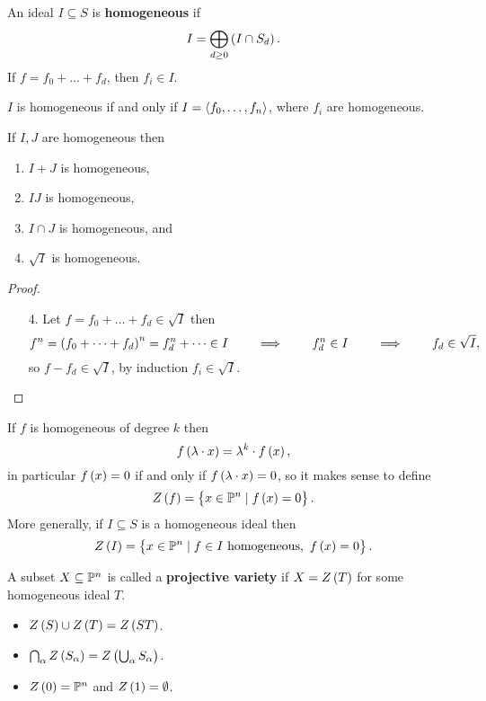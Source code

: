 \begin{definition}
An ideal $ I \subseteq S $ is \textbf{homogeneous} if
$$ I = \bigoplus_{d \ge 0} \br{I \cap S_d}. $$
If $ f = f_0 + \dots + f_d $, then $ f_i \in I $.
\end{definition}

\begin{remark}
$ I $ is homogeneous if and only if $ I = \abr{f_0, \dots, f_n} $, where $ f_i $ are homogeneous.
\end{remark}

\begin{lemma}
If $ I, J $ are homogeneous then
\begin{enumerate}
\item $ I + J $ is homogeneous,
\item $ IJ $ is homogeneous,
\item $ I \cap J $ is homogeneous, and
\item $ \sqrt{I} $ is homogeneous.
\end{enumerate}
\end{lemma}

\begin{proof}
\hfill
\begin{itemize}
\item[4.] Let $ f = f_0 + \dots + f_d \in \sqrt{I} $ then
$$ f^n = \br{f_0 + \dots + f_d}^n = f_d^n + \dots \in I \qquad \implies \qquad f_d^n \in I \qquad \implies \qquad f_d \in \sqrt{I}, $$
so $ f - f_d \in \sqrt{I} $, by induction $ f_i \in \sqrt{I} $.
\end{itemize}
\end{proof}

\begin{definition}
If $ f $ is homogeneous of degree $ k $ then
$$ f\br{\lambda \cdot x} = \lambda^k \cdot f\br{x}, $$
in particular $ f\br{x} = 0 $ if and only if $ f\br{\lambda \cdot x} = 0 $, so it makes sense to define
$$ Z\br{f} = \cbr{x \in \P^n \mid f\br{x} = 0}. $$
More generally, if $ I \subseteq S $ is a homogeneous ideal then
$$ Z\br{I} = \cbr{x \in \P^n \mid f \in I \ \text{homogeneous}, \ f\br{x} = 0}. $$
\end{definition}

\pagebreak

\begin{definition}
A subset $ X \subseteq \P^n $ is called a \textbf{projective variety} if $ X = Z\br{T} $ for some homogeneous ideal $ T $.
\end{definition}

\begin{proposition}
\hfill
\begin{itemize}
\item $ Z\br{S} \cup Z\br{T} = Z\br{ST} $.
\item $ \bigcap_\alpha Z\br{S_\alpha} = Z\br{\bigcup_\alpha S_\alpha} $.
\item $ Z\br{0} = \P^n $ and $ Z\br{1} = \emptyset $.
\end{itemize}
\end{proposition}

